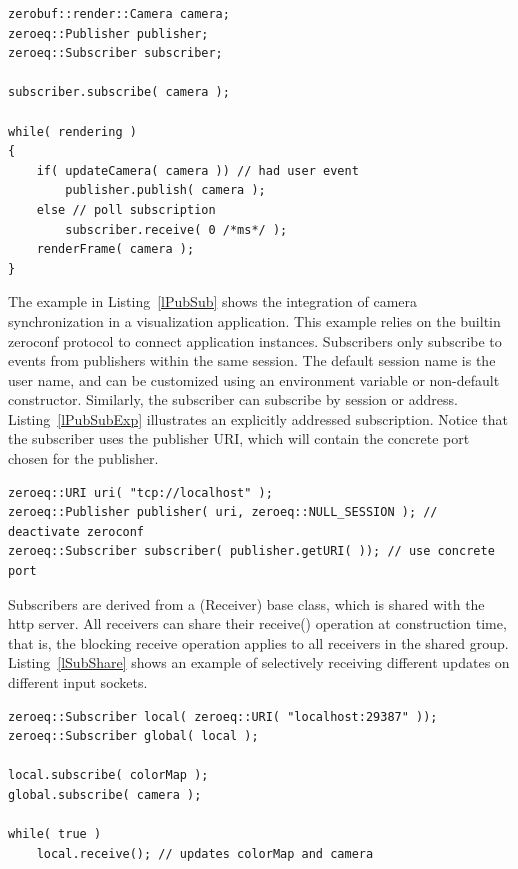 \documentclass[10pt]{llncs}
\newcommand{\lref}[1]{Listing~\ref{#1}}
\begin{document}
\begin{lstlisting}[float, caption=Publish-Subscribe Example, label=lPubSub]
zerobuf::render::Camera camera;
zeroeq::Publisher publisher;
zeroeq::Subscriber subscriber;

subscriber.subscribe( camera );

while( rendering )
{
    if( updateCamera( camera )) // had user event
        publisher.publish( camera );
    else // poll subscription
        subscriber.receive( 0 /*ms*/ );
    renderFrame( camera );
}
\end{lstlisting}

The example in \lref{lPubSub} shows the integration of camera
synchronization in a visualization application. This example relies on the
builtin zeroconf protocol to connect application instances. Subscribers only
subscribe to events from publishers within the same session. The default
session name is the user name, and can be customized using an environment
variable or non-default constructor. Similarly, the subscriber can subscribe by
session or address. \lref{lPubSubExp} illustrates an explicitly addressed
subscription. Notice that the subscriber uses the publisher URI, which will
contain the concrete port chosen for the publisher.

\begin{lstlisting}[float, caption=Explicit Addressing,label=lPubSubExp]
zeroeq::URI uri( "tcp://localhost" );
zeroeq::Publisher publisher( uri, zeroeq::NULL_SESSION ); // deactivate zeroconf
zeroeq::Subscriber subscriber( publisher.getURI( )); // use concrete port
\end{lstlisting}

Subscribers are derived from a \textsf(Receiver) base class, which is shared
with the http server. All receivers can share their \textsf{receive()}
operation at construction time, that is, the blocking receive operation applies
to all receivers in the shared group. \lref{lSubShare} shows an example of
selectively receiving different updates on different input sockets.

\begin{lstlisting}[float,caption=Subscriber Sharing, label=lSubShare]
zeroeq::Subscriber local( zeroeq::URI( "localhost:29387" ));
zeroeq::Subscriber global( local );

local.subscribe( colorMap );
global.subscribe( camera );

while( true )
    local.receive(); // updates colorMap and camera
\end{lstlisting}
\end{document}
